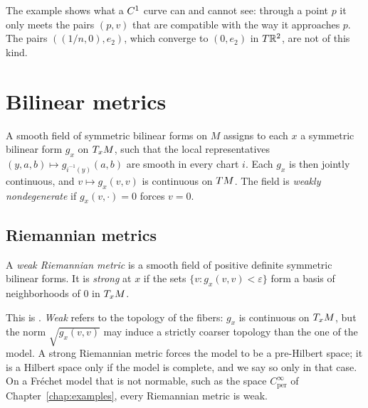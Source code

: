The example shows what a $C^{1}$ curve can and cannot see: through a point $p$ it only meets the
pairs $(p, v)$ that are compatible with the way it approaches $p$. The pairs $((1/n, 0), e_2)$,
which converge to $(0, e_2)$ in $T\mathbb{R}^2$, are not of this kind.

\section{Bilinear metrics}

\begin{definition}
  \label{def:mt-bilin}
  \leanok
  A smooth field of symmetric bilinear forms on $M$ assigns to each $x$ a symmetric bilinear form
  $g_x$ on $T_x M$, such that the local representatives $(y, a, b) \mapsto g_{i^{-1}(y)}(a, b)$ are
  smooth in every chart $i$. Each $g_x$ is then jointly continuous, and $v \mapsto g_x(v,v)$ is
  continuous on $T M$. The field is \emph{weakly nondegenerate} if $g_x(v, \cdot) = 0$ forces
  $v = 0$.
\end{definition}

\subsection{Riemannian metrics}

\begin{definition}
  \label{def:weak-riemannian}
  \leanok
  A \emph{weak Riemannian metric} is a smooth field of positive definite symmetric bilinear forms.
  It is \emph{strong} at $x$ if the sets $\{v : g_x(v,v) < \varepsilon\}$ form a basis of
  neighborhoods of $0$ in $T_x M$.
\end{definition}

This is \cite[Def.~4.1.1]{Sch23}. \emph{Weak} refers to the topology of the fibers: $g_x$ is
continuous on $T_x M$, but the norm $\sqrt{g_x(v,v)}$ may induce a strictly coarser topology than
the one of the model. A strong Riemannian metric forces the model to be a pre-Hilbert space; it is
a Hilbert space only if the model is complete, and we say so only in that case. On a Fréchet model
that is not normable, such as the space $C^\infty_{\mathrm{per}}$ of Chapter~\ref{chap:examples},
every Riemannian metric is weak.


